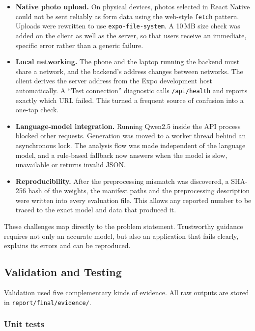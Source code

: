 \begin{itemize}
  \item \textbf{Native photo upload.} On physical devices, photos selected in React Native could not be sent reliably as form data using the web-style \texttt{fetch} pattern. Uploads were rewritten to use \texttt{expo-file-system}. A 10\,MB size check was added on the client as well as the server, so that users receive an immediate, specific error rather than a generic failure.
  \item \textbf{Local networking.} The phone and the laptop running the backend must share a network, and the backend's address changes between networks. The client derives the server address from the Expo development host automatically. A ``Test connection'' diagnostic calls \texttt{/api/health} and reports exactly which URL failed. This turned a frequent source of confusion into a one-tap check.
  \item \textbf{Language-model integration.} Running Qwen2.5 inside the API process blocked other requests. Generation was moved to a worker thread behind an asynchronous lock. The analysis flow was made independent of the language model, and a rule-based fallback now answers when the model is slow, unavailable or returns invalid JSON.
  \item \textbf{Reproducibility.} After the preprocessing mismatch was discovered, a SHA-256 hash of the weights, the manifest paths and the preprocessing description were written into every evaluation file. This allows any reported number to be traced to the exact model and data that produced it.
\end{itemize}

These challenges map directly to the problem statement. Trustworthy guidance requires not only an accurate model, but also an application that fails clearly, explains its errors and can be reproduced.

\subsection{Validation and Testing}
\label{sec:validation}

Validation used five complementary kinds of evidence. All raw outputs are stored in \texttt{report/final/evidence/}.

\subsubsection*{Unit tests}

